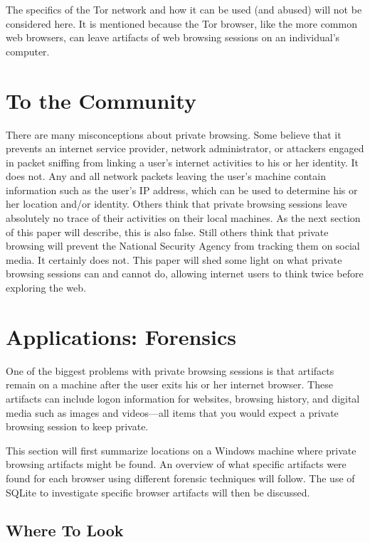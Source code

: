 \documentclass[pdftex,letterpaper,titlepage,12pt]{article}
\begin{document}
    The specifics of the Tor network and how it can be used (and abused) will
    not be considered here. It is mentioned because the Tor browser, like the
    more common web browsers, can leave artifacts of web browsing sessions on
    an individual's computer.
    
  \section{To the Community}
  There are many misconceptions about private browsing. Some believe that it
  prevents an internet service provider, network administrator, or attackers
  engaged in packet sniffing from linking a user's internet activities to his
  or her identity. It does not. Any and all network packets leaving the user's
  machine contain information such as the user's IP address, which can be used
  to determine his or her location and/or identity. Others think that private
  browsing sessions leave absolutely no trace of their activities on their
  local machines. As the next section of this paper will describe, this is also
  false. Still others think that private browsing will prevent the National
  Security Agency from tracking them on social media. It certainly does not.
  This paper will shed some light on what private browsing sessions can and
  cannot do, allowing internet users to think twice before exploring the web.

  \section{Applications: Forensics}
  One of the biggest problems with private browsing sessions is that artifacts
  remain on a machine after the user exits his or her internet browser. These
  artifacts can include logon information for websites, browsing history,
  and digital media such as images and videos---all items that you would expect
  a private browsing session to keep private.\cite{ohana13}

  This section will first summarize locations on a Windows machine where
  private browsing artifacts might be found. An overview of what specific
  artifacts were found for each browser using different forensic techniques
  will follow. The use of SQLite to investigate specific browser artifacts will
  then be discussed.

    \subsection{Where To Look}
    
\end{document}
